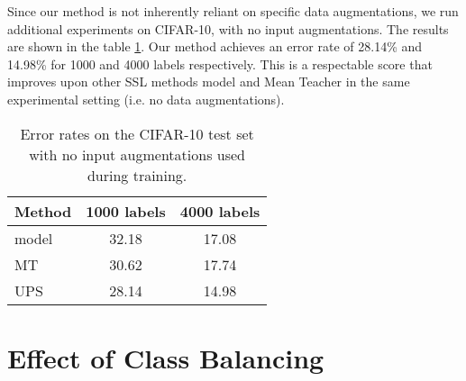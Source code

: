 \documentclass{article} \usepackage{iclr2021_conference,times}
\begin{document}
Since our method is not inherently reliant on specific data augmentations, we run additional experiments on CIFAR-10, with no input augmentations. The results are shown in the table \ref{tab:noaugments}. Our method achieves an error rate of 28.14\% and 14.98\% for 1000 and 4000 labels respectively. This is a respectable score that improves upon other SSL methods  model \citep{LaineA17} and Mean Teacher \citep{NIPS2017_6719_meanT} in the same experimental setting (i.e. no data augmentations).


\begin{table}[t]
\caption{Error rates on the CIFAR-10 test set with no input augmentations used during training.}
\begin{center}
\label{tab:noaugments}
\small
\begin{tabular}{l|c|c}
\hline
Method & 1000 labels & 4000 labels \\ \hline
 model & 32.18 & 17.08 \\ 
MT  &  30.62 & 17.74 \\ 
UPS & 28.14 & 14.98  \\ 
\hline
\end{tabular}
\end{center}
\end{table}








\section{Effect of Class Balancing}
\label{sec:class_balance}
\end{document}

